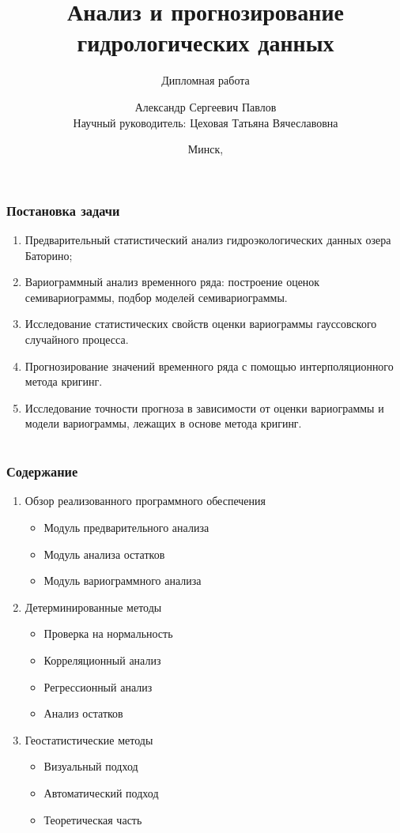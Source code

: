 \documentclass[notheorems]{beamer}
\title[Анализ и прогнозирование гидрологических данных]{Анализ и прогнозирование гидрологических данных}
\subtitle{Дипломная работа}
\author[Павлов А.С.]{Александр Сергеевич Павлов \\ \smallskip Научный руководитель: Цеховая Татьяна Вячеславовна}
\institute[БГУ, ФПМИ]{Факультет прикладной математики и информатики \\ \smallskip Кафедра теории вероятностей и математической статистики}
\date{Минск, \the\year}
\theoremstyle{definition}
\theoremstyle{example}
\theoremstyle{plain}
\begin{document}
\begin{frame}[plain]
  \titlepage
\end{frame}

\begin{frame}
  \frametitle{Постановка задачи}
  \begin{enumerate}
    \item Предварительный статистический анализ гидроэкологических данных озера Баторино;
    \item Вариограммный анализ временного ряда: построение оценок семивариограммы, подбор моделей семивариограммы.
    \item Исследование статистических свойств оценки вариограммы гауссовского случайного процесса.
    \item Прогнозирование значений временного ряда с помощью интерполяционного метода кригинг.
    \item Исследование точности прогноза в зависимости от оценки вариограммы и модели вариограммы, лежащих в основе метода кригинг.
  \end{enumerate}
\end{frame}

\section[Содержание]{}
\begin{frame}
  \frametitle{Содержание}
  \begin{enumerate}
    \item Обзор реализованного программного обеспечения
      \begin{itemize}
        \item Модуль предварительного анализа
        \item Модуль анализа остатков
        \item Модуль вариограммного анализа
      \end{itemize}
    \item Детерминированные методы
      \begin{itemize}
        \item Проверка на нормальность
        \item Корреляционный анализ
        \item Регрессионный анализ
        \item Анализ остатков
      \end{itemize}
    \item Геостатистические методы
      \begin{itemize}
        \item Визуальный подход
        \item Автоматический подход
        \item Теоретическая часть
      \end{itemize}
  \end{enumerate}
\end{frame}
\end{document}
